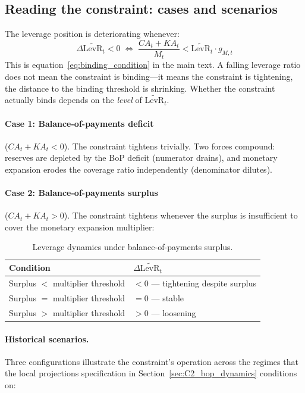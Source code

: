 \subsection{Reading the constraint: cases and scenarios}
\label{app:constraint_cases}

The leverage position is deteriorating whenever:
%
\begin{equation}
\label{app:eq:binding}
\Delta\widetilde{\text{LevR}}_t < 0 \;\iff\;
\frac{CA_t + KA_t}{M_t} < \widetilde{\text{LevR}}_t \cdot g_{M,t}
\end{equation}
%
This is equation~\eqref{eq:binding_condition} in the main text. A falling
leverage ratio does not mean the constraint is binding---it means the
constraint is tightening, the distance to the binding threshold is
shrinking. Whether the constraint actually binds depends on the
\textit{level} of $\widetilde{\text{LevR}}_t$.

\paragraph{Case 1: Balance-of-payments deficit}
($CA_t + KA_t < 0$). The constraint tightens trivially. Two forces
compound: reserves are depleted by the BoP deficit (numerator drains),
and monetary expansion erodes the coverage ratio independently
(denominator dilutes).

\paragraph{Case 2: Balance-of-payments surplus}
($CA_t + KA_t > 0$). The constraint tightens whenever the surplus is
insufficient to cover the monetary expansion multiplier:

\begin{table}[h]
\centering
\small
\begin{tabular}{ll}
\toprule
Condition & $\Delta\widetilde{\text{LevR}}_t$ \\
\midrule
Surplus $<$ multiplier threshold & $< 0$ --- tightening despite surplus \\
Surplus $=$ multiplier threshold & $= 0$ --- stable \\
Surplus $>$ multiplier threshold & $> 0$ --- loosening \\
\bottomrule
\end{tabular}
\caption{Leverage dynamics under balance-of-payments surplus.}
\label{app:tab:surplus}
\end{table}

\paragraph{Historical scenarios.}
Three configurations illustrate the constraint's operation across the
regimes that the local projections specification in
Section~\ref{sec:C2_bop_dynamics} conditions on:

